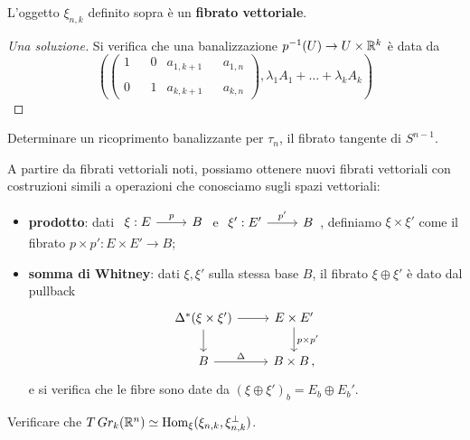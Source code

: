 \begin{exercise}
	L'oggetto $\xi_{n,k}$ definito sopra è un \textbf{fibrato vettoriale}.
	\begin{proof}[Una soluzione]
		Si verifica che una banalizzazione $p^{-1}(U) \to U \times {\mathbb R}^{k}$ è data da
		\begin{equation*}
			\left( 
				\begin{pmatrix}
					1 & & 0 & a_{1,k+1} & & a_{1,n} \\
					& & & & & \\
					0 & & 1 & a_{k,k+1} & & a_{k,n}
				\end{pmatrix},
				\lambda_{1}A_{1} + \dots + \lambda_{k}A_{k}
			\right)
		\end{equation*}
	\end{proof}
\end{exercise}

\begin{exercise}
	Determinare un ricoprimento banalizzante per $\tau_{n}$, 
	il fibrato tangente di $S^{n-1}$.
\end{exercise}

A partire da fibrati vettoriali noti,
possiamo ottenere nuovi fibrati vettoriali con costruzioni
simili a operazioni che conosciamo sugli spazi vettoriali:
\begin{itemize}
	\item \textbf{prodotto}: dati
	$\begin{tikzcd}
		\xi : E \ar[r, "p"] & B
	\end{tikzcd}$ e 
	$\begin{tikzcd}
		\xi' : E' \ar[r, "p'"] & B
	\end{tikzcd}$,
	definiamo $\xi \times \xi'$ come il fibrato $p \times p' : E \times E' \to B$;
	
	\item \textbf{somma di Whitney}: dati $\xi,\xi'$ sulla stessa base $B$,
	il fibrato $\xi \oplus \xi'$
	è dato dal pullback
	\begin{equation*}
		\begin{tikzcd}
			\Delta^{*}(\xi \times \xi') \ar[r] \ar[d]
			& E \times E' \ar[d, "p \times p'"] \\
			B \ar[r, "\Delta"] & B \times B\,,
		\end{tikzcd}
	\end{equation*}
	e si verifica che le fibre sono date da $\left( \xi \oplus \xi' \right)_{b} = E_{b} \oplus E_{b}'$.
\end{itemize}

\begin{exercise}
	Verificare che $T\,Gr_{k}({\mathbb R}^{n}) \simeq \operatorname{Hom}_{\xi}(\xi_{n,k},\xi_{n,k}^{\perp})$.
\end{exercise}



